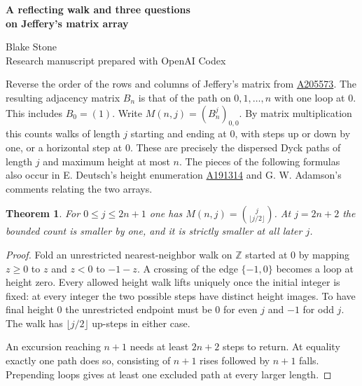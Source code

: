 \documentclass[11pt,letterpaper]{article}
\newtheorem{theorem}{Theorem}
\newcommand{\oeis}[1]{\href{https://oeis.org/A#1}{A#1}}
\begin{document}
\thispagestyle{plain}
\begin{center}
{\LARGE\bfseries A reflecting walk and three questions\\[0.12em] on Jeffery's matrix array\par}
\vspace{0.5em}
Blake Stone\\
{\small Research manuscript prepared with OpenAI Codex}
\end{center}

\begin{abstract}
The bottom corner of a power of L. Edson Jeffery's matrix counts dispersed Dyck paths with bounded height. This identifies the first degree where the central binomial row approximation fails, proves the proposed column generating function, and gives the reduced row generating function with its necessary index shifts. Its denominator has degree $n+1$ in row $n$.
\end{abstract}

Reverse the order of the rows and columns of Jeffery's matrix from \oeis{205573}. The resulting adjacency matrix $B_n$ is that of the path on $0,1,\ldots,n$ with one loop at $0$. This includes $B_0=(1)$. Write $M(n,j)=(B_n^j)_{0,0}$. By matrix multiplication this counts walks of length $j$ starting and ending at $0$, with steps up or down by one, or a horizontal step at $0$. These are precisely the dispersed Dyck paths of length $j$ and maximum height at most $n$. The pieces of the following formulas also occur in E. Deutsch's height enumeration \oeis{191314} and G. W. Adamson's comments relating the two arrays.

\begin{theorem}
For $0\le j\le2n+1$ one has $M(n,j)=\binom{j}{\lfloor j/2\rfloor}$. At $j=2n+2$ the bounded count is smaller by one, and it is strictly smaller at all later $j$.
\end{theorem}
\begin{proof}
Fold an unrestricted nearest-neighbor walk on $\mathbb Z$ started at $0$ by mapping $z\ge0$ to $z$ and $z<0$ to $-1-z$. A crossing of the edge $\{-1,0\}$ becomes a loop at height zero. Every allowed height walk lifts uniquely once the initial integer is fixed: at every integer the two possible steps have distinct height images. To have final height $0$ the unrestricted endpoint must be $0$ for even $j$ and $-1$ for odd $j$. The walk has $\lfloor j/2\rfloor$ up-steps in either case.

An excursion reaching $n+1$ needs at least $2n+2$ steps to return. At equality exactly one path does so, consisting of $n+1$ rises followed by $n+1$ falls. Prepending loops gives at least one excluded path at every larger length.
\end{proof}
\end{document}

